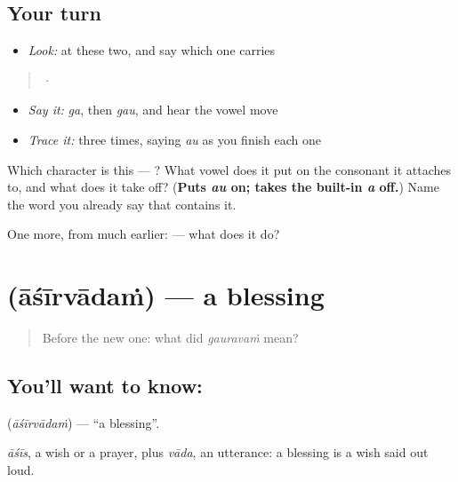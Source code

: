 \subsection*{Your turn}
\begin{itemize}
\raggedright
  \item \emph{Look:} at these two, and say which one carries 
\end{itemize}

\begin{quote}
  ·  
\end{quote}

\begin{itemize}
\raggedright
  \item \emph{Say it:} \emph{ga}, then \emph{gau}, and hear the vowel move
  \item \emph{Trace it:}  three times, saying \emph{au} as you finish each one
\end{itemize}

\begin{tcolorbox}[breakable,colback=teal!4,colframe=teal!35!black,title={Before you move on}]
Which character is this — ? What vowel does it put on the consonant it attaches to, and what does it take off? (\textbf{Puts \emph{au} on; takes the built-in \emph{a} off.}) Name the word you already say that contains it.

One more, from much earlier:  — what does it do?
\end{tcolorbox}
\section[\texorpdfstring{\te{ఆశీర్వాదం} (āśīrvādaṁ)}{ఆశీర్వాదం (āśīrvādaṁ)}]{ (āśīrvādaṁ) — a blessing}

\label{lesson:TE-C51-blessing}



\begin{quote}
Before the new one: what did \emph{gauravaṁ} mean?
\end{quote}

\subsection*{You'll want to know: }
\textbf{} (\emph{āśīrvādaṁ}) — \textquotedblleft{}a blessing\textquotedblright{}.

\emph{āśīs}, a wish or a prayer, plus \emph{vāda}, an utterance: a blessing is a wish said out loud.

